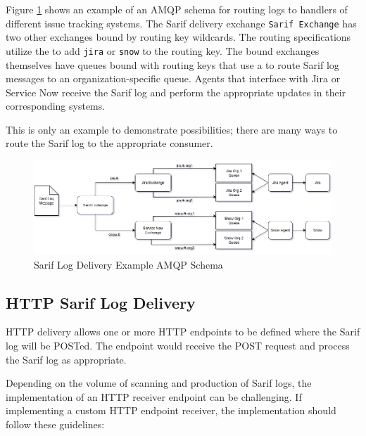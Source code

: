 Figure \ref{fig:sarif-amqp-example} shows an example of an AMQP schema for routing logs to handlers of different issue
tracking systems.  The Sarif delivery exchange \texttt{Sarif Exchange} has two other exchanges bound by routing key
wildcards.  The routing specifications utilize the  to
add \texttt{jira} or \texttt{snow} to the routing key.  The bound exchanges themselves have queues bound with routing keys
that use a  to route Sarif log messages to an organization-specific
queue.  Agents that interface with Jira or Service Now receive the Sarif log and perform the appropriate updates
in their corresponding systems.

This is only an example to demonstrate possibilities; there are many ways to route the Sarif log
to the appropriate consumer.


\begin{figure}[h]
    \centering
    \includegraphics[width=\textwidth]{graphics/cxoneflow-diagrams-sarif-exchange-example.png}
    \caption{Sarif Log Delivery Example AMQP Schema}
    \label{fig:sarif-amqp-example}
\end{figure}


\subsection{HTTP Sarif Log Delivery}\label{sec:push-sarif-http}

HTTP delivery allows one or more HTTP endpoints to be defined where the Sarif log will be
POSTed.  The endpoint would receive the POST request and process the Sarif log as
appropriate.

Depending on the volume of scanning and production of Sarif logs, the implementation
of an HTTP receiver endpoint can be challenging.  If implementing a custom HTTP endpoint
receiver, the implementation should follow these guidelines:



